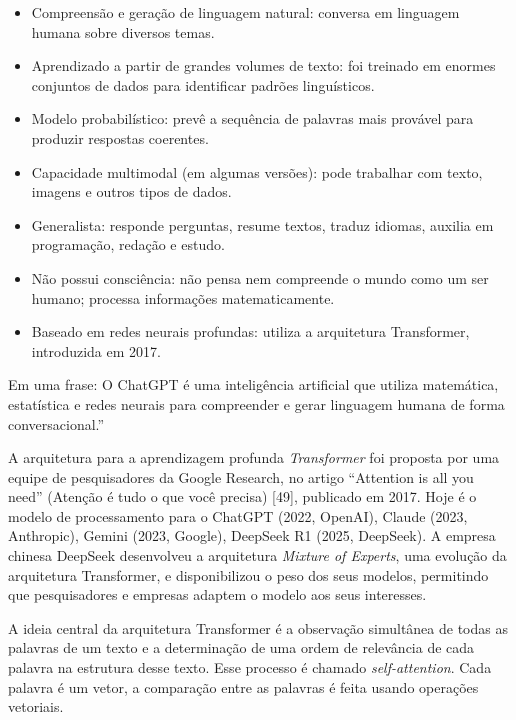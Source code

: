 \documentclass{hipatia}
\begin{document}
\begin{itemize}
    \item Compreensão e geração de linguagem natural: conversa em linguagem humana sobre diversos temas.
\item Aprendizado a partir de grandes volumes de texto: foi treinado em enormes conjuntos de dados para identificar padrões linguísticos.
\item Modelo probabilístico: prevê a sequência de palavras mais provável para produzir respostas coerentes.
\item Capacidade multimodal (em algumas versões): pode trabalhar com texto, imagens e outros tipos de dados.
\item Generalista: responde perguntas, resume textos, traduz idiomas, auxilia em programação, redação e estudo.
\item Não possui consciência: não pensa nem compreende o mundo como um ser humano; processa informações matematicamente.
\item Baseado em redes neurais profundas: utiliza a arquitetura Transformer, introduzida em 2017.
\end{itemize}


Em uma frase: O ChatGPT é uma inteligência artificial que utiliza matemática, estatística e redes neurais para compreender e gerar linguagem humana de forma conversacional.''



\vspace{0,3cm}

A arquitetura para a aprendizagem profunda \textit{Transformer} foi proposta por uma equipe de pesquisadores da Google Research, no artigo ``Attention is all you need'' (Atenção é tudo o que você precisa) 	[49], publicado em 2017. Hoje é o modelo de processamento para o ChatGPT (2022, OpenAI), Claude (2023, Anthropic), Gemini (2023, Google), DeepSeek R1 (2025, DeepSeek). A empresa chinesa DeepSeek desenvolveu a arquitetura \textit{Mixture of Experts}, uma evolução da arquitetura Transformer, e disponibilizou o peso dos seus modelos, permitindo que pesquisadores e empresas adaptem o modelo aos seus interesses.
	
A ideia central da arquitetura Transformer é a observação simultânea de todas as palavras de um texto e a determinação de uma ordem de relevância de cada palavra na estrutura desse texto. Esse processo é chamado \textit{self-attention}. Cada palavra é um vetor, a comparação entre as palavras é feita usando operações vetoriais.
	
\end{document}
